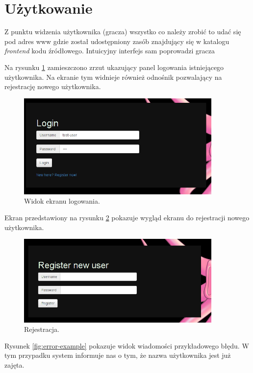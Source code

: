 \section{Użytkowanie}
Z punktu widzenia użytkownika (gracza) wszystko co należy zrobić to udać się pod adres www gdzie został udostępniony zasób znajdujący się w katalogu \emph{frontend} kodu źródłowego. Intuicyjny interfejs sam poprowadzi gracza

Na rysunku \ref{fig:login} zamieszczono zrzut ukazujący panel logowania istniejącego użytkownika. Na ekranie tym widnieje również odnośnik pozwalający na rejestrację nowego użytkownika.

\begin{figure}[h]
    \centering
    \includegraphics[width=0.9\textwidth]{imgs/login.png}
    \caption{Widok ekranu logowania.}
    \label{fig:login}
\end{figure}

Ekran przedstawiony na rysunku \ref{fig:register} pokazuje wygląd ekranu do rejestracji nowego użytkownika.

\begin{figure}[h]
    \centering
    \includegraphics[width=0.9\textwidth]{imgs/register.png}
    \caption{Rejestracja.}
    \label{fig:register}
\end{figure}
Rysunek \ref{fig:error-example} pokazuje widok wiadomości przykładowego błędu. W tym przypadku system informuje nas o tym, że nazwa użytkownika jest już zajęta.

